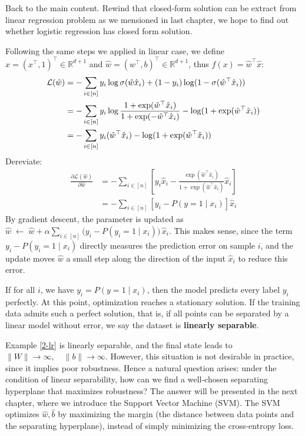 \documentclass[../main]{subfiles}
\begin{document}
\vspace{1em}
Back to the main content. Rewind that closed-form solution can be extract from linear regression problem as we mensioned in last chapter, we hope to find out whether logistic regression has closed form solution.

Following the same steps we applied in linear case, we define $\hat x=(x^\top,1)^\top\in\mathbb R^{d+1}$ and $\hat w=(w^\top,b)^{\top}\in\mathbb R^{d+1}$, thus $f(x)=\hat w^\top \hat x$:
\begin{align}
  \mathcal L(\hat w)&=-\sum_{i\in[n]}y_i\log\sigma(\hat w\hat x_i)+(1-y_i)\log(1-\sigma(\hat w^\top\hat x_i))\notag\\
  &=-\sum_{i\in[n]}y_i\log\frac{1+\exp(\hat w^\top\hat x_i)}{1+\exp(-\hat w^\top\hat x_i)}-\log(1+\exp(\hat w^\top\hat x_i))\notag\\
  &=-\sum_{i\in[n]}y_i(\hat w^\top\hat x_i)-\log(1+\exp(\hat w^\top\hat x_i))
\end{align}
Dereviate:
\begin{align}
  \frac{\partial\mathcal L(\hat w)}{\partial \hat w}&=-\sum_{i\in[n]}\left[y_i\hat x_i-\frac{\exp(\hat w^\top\hat x_i)}{1+\exp(\hat w^\top\hat x_i)}\hat x_i\right]\\
  &=-\sum_{i\in [n]}\left[y_i-P(y=1\mid x_i)\right]\hat x_i
\end{align}
By gradient descent, the parameter is updated as$
  \hat w \;\leftarrow\; \hat w + \alpha \sum_{i \in [n]} \Big(y_i - P(y_i=1 \mid x_i)\Big)\,\hat x_i .$
This makes sense, since the term $y_i - P(y_i=1 \mid x_i)$ directly measures the prediction error on sample $i$, and the update moves $\hat w$ a small step along the direction of the input $\hat x_i$ to reduce this error.

If for all $i$, we have $y_i = P(y=1 \mid x_i)$, then the model predicts every label $y_i$ perfectly. At this point, optimization reaches a stationary solution. If the training data admits such a perfect solution, that is, if all points can be separated by a linear model without error, we say the dataset is \textbf{linearly separable}.

Example \ref{2-lr} is linearly separable, and the final state leads to $\|W\| \to \infty, \quad \|b\| \to \infty$. However, this situation is not desirable in practice, since it implies poor robustness. Hence a natural question arises: under the condition of linear separability, how can we find a well-chosen separating hyperplane that maximizes robustness? The answer will be presented in the next chapter, where we introduce the Support Vector Machine (SVM). The SVM optimizes $\hat w, \hat b$ by maximizing the margin (the distance between data points and the separating hyperplane), instead of simply minimizing the cross-entropy loss.
\end{document}
